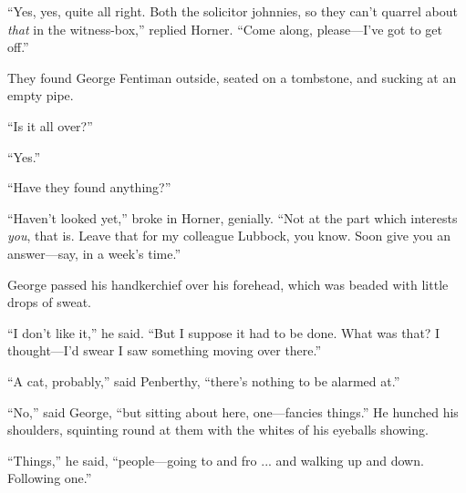 \enquote{Yes, yes, quite all right. Both the solicitor johnnies, so they can't quarrel about \textit{that} in the witness-box,} replied Horner. \enquote{Come along, please\allowbreak---\allowbreak I've got to get off.}

They found George Fentiman outside, seated on a tombstone, and sucking at an empty pipe.

\enquote{Is it all over?}

\enquote{Yes.}

\enquote{Have they found anything?}

\enquote{Haven't looked yet,} broke in Horner, genially. \enquote{Not at the part which interests \textit{you}, that is. Leave that for my colleague Lubbock, you know. Soon give you an answer\allowbreak---\allowbreak say, in a week's time.}

George passed his handkerchief over his forehead, which was beaded with little drops of sweat.

\enquote{I don't like it,} he said. \enquote{But I suppose it had to be done. What was that? I thought\allowbreak---\allowbreak I'd swear I saw something moving over there.}

\enquote{A cat, probably,} said Penberthy, \enquote{there's nothing to be alarmed at.}

\enquote{No,} said George, \enquote{but sitting about here, one\allowbreak---\allowbreak fancies things.} He hunched his shoulders, squinting round at them with the whites of his eyeballs showing.

\enquote{Things,} he said, \enquote{people\allowbreak---\allowbreak going to and fro ... and walking up and down. Following one.}